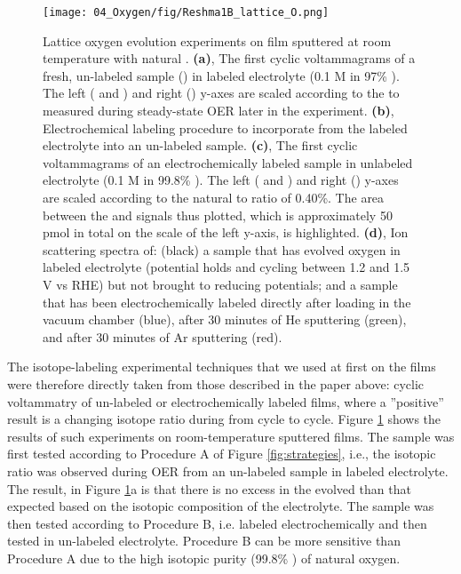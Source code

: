 \begin{figure}[h!]
	\centering
	\texttt{[image: 04\_Oxygen/fig/Reshma1B\_lattice\_O.png]}
	\caption{Lattice oxygen evolution experiments on  film sputtered at room temperature with natural . \textbf{(a)}, The first cyclic voltammagrams of a fresh, un-labeled sample () in labeled electrolyte (0.1 M  in 97\% ). The left ( and ) and right () y-axes are scaled according to the  to  measured during steady-state OER later in the experiment. \textbf{(b)}, Electrochemical labeling procedure to incorporate  from the labeled electrolyte into an un-labeled sample. \textbf{(c)}, The first cyclic voltammagrams of an electrochemically labeled sample in unlabeled electrolyte (0.1 M  in 99.8\% ). The left ( and ) and right () y-axes are scaled according to the natural  to  ratio of 0.40\%. The area between the  and  signals thus plotted, which is approximately 50 pmol in total on the scale of the left y-axis, is highlighted. \textbf{(d)}, Ion scattering spectra of: (black) a sample that has evolved oxygen in labeled electrolyte (potential holds and cycling between 1.2 and 1.5 V vs RHE) but not brought to reducing potentials; and a sample that has been electrochemically labeled directly after loading in the vacuum chamber (blue), after 30 minutes of He sputtering (green), and after 30 minutes of Ar sputtering (red).
	}
	\label{fig:Reshma1_lattice}
\end{figure}

The isotope-labeling experimental techniques that we used at first on the  films were therefore directly taken from those described in the paper above: cyclic voltammatry of un-labeled or electrochemically labeled films, where a  ''positive'' result is a changing isotope ratio during from cycle to cycle. Figure \ref{fig:Reshma1_lattice} shows the results of such experiments on room-temperature sputtered  films. The sample was first tested according to Procedure A of Figure \ref{fig:strategies}, i.e., the isotopic ratio was observed during OER from an un-labeled sample in labeled electrolyte. The result, in Figure \ref{fig:Reshma1_lattice}a is that there is no excess  in the evolved  than that expected based on the isotopic composition of the electrolyte. The sample was then tested according to Procedure B, i.e. labeled electrochemically and then tested in un-labeled electrolyte. Procedure B can be more sensitive than Procedure A due to the high isotopic purity (99.8\% ) of natural oxygen. 

